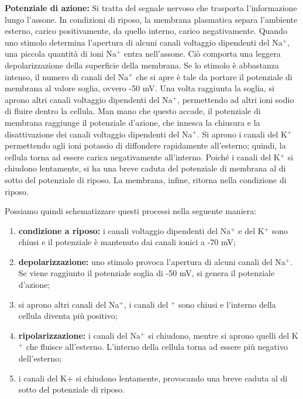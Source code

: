 \documentclass[a4paper]{article}
\begin{document}
\pagebreak

\textbf{Potenziale di azione:} Si tratta del segnale nervoso che trasporta l'informazione lungo l'assone.
In condizioni di riposo, la membrana plasmatica separa l'ambiente esterno, carico positivamente, da quello
interno, carico negativamente. Quando uno stimolo determina l'apertura di alcuni canali
voltaggio dipendenti del Na\({}^+\), una piccola quantità di ioni Na\({}^+\) entra nell'assone. Ciò
comporta una leggera depolarizzazione della superficie della membrana. Se lo stimolo è
abbastanza intenso, il numero di canali del Na\({}^+\) che si apre è tale da portare il potenziale di
membrana al valore soglia, ovvero -50 mV. Una volta raggiunta la soglia, si aprono altri
canali voltaggio dipendenti del Na\({}^+\), permettendo ad altri ioni sodio di fluire dentro la cellula.
Man mano che questo accade, il potenziale di membrana raggiunge il potenziale d'azione,
che innesca la chiusura e la disattivazione dei canali voltaggio dipendenti del Na\({}^+\). Si aprono
i canali del K\({}^+\) permettendo agli ioni potassio di diffondere rapidamente all'esterno; quindi,
la cellula torna ad essere carica negativamente all'interno. Poiché i canali del K\({}^+\) si chiudono
lentamente, si ha una breve caduta del potenziale di membrana al di sotto del potenziale di
riposo. La membrana, infine, ritorna nella condizione di riposo.

Possiamo quindi schematizzare questi processi nella seguente maniera:
\begin{enumerate}
    \item \textbf{condizione a riposo:} i canali voltaggio dipendenti del Na\({}^+\) e del K\({}^+\) sono chiusi e il potenziale
        è mantenuto dai canali ionici a -70 mV;
    \item \textbf{depolarizzazione:} uno stimolo provoca l'apertura di alcuni canali del Na\({}^+\). Se viene raggiunto
        il potenziale soglia di -50 mV, si genera il potenziale d'azione;
    \item si aprono altri canali del Na\({}^+\), i canali del \({}^+\) sono chiusi e l'interno della cellula diventa più
        positivo;
    \item \textbf{ripolarizzazione:} i canali del Na\({}^+\) si chiudono, mentre si aprono quelli del K\({}^+\) che fluisce
        all'esterno. L'interno della cellula torna ad essere più negativo dell'esterno;
    \item i canali del K+ si chiudono lentamente, provocando una breve caduta al di sotto del
        potenziale di riposo.
\end{enumerate}
\end{document}
